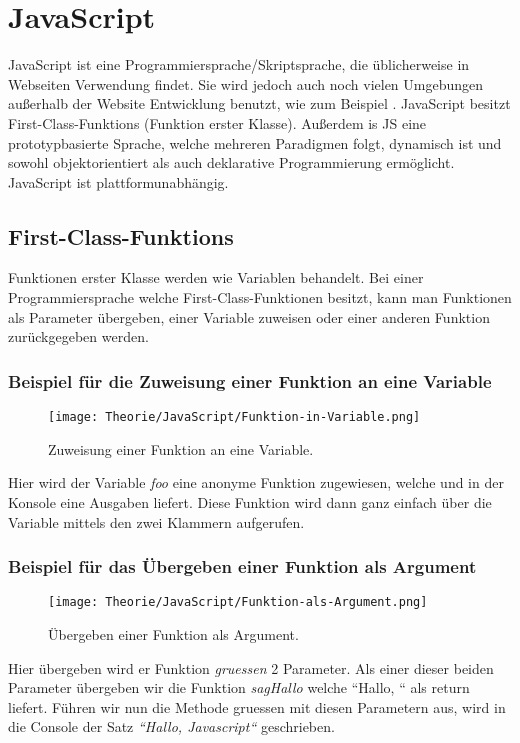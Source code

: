 \section{JavaScript}
\label{js}

JavaScript ist eine Programmiersprache/Skriptsprache, die üblicherweise in Webseiten Verwendung findet. Sie wird jedoch auch noch vielen Umgebungen außerhalb der Website Entwicklung benutzt, 
wie zum Beispiel .
JavaScript besitzt First-Class-Funktions (Funktion erster Klasse). Außerdem is JS eine prototypbasierte Sprache, welche mehreren Paradigmen folgt, dynamisch ist und sowohl 
objektorientiert als auch deklarative Programmierung ermöglicht. JavaScript ist plattformunabhängig.

\subsection{First-Class-Funktions}
Funktionen erster Klasse werden wie Variablen behandelt. Bei einer Programmiersprache welche First-Class-Funktionen besitzt, kann man Funktionen als Parameter übergeben, einer Variable zuweisen oder
einer anderen Funktion zurückgegeben werden.
\pagebreak

\begin{center}
    \subsubsection{Beispiel für die Zuweisung einer Funktion an eine Variable}
\begin{figure}[htbp]
    \centerline{\texttt{[image: Theorie/JavaScript/Funktion-in-Variable.png]}}
    \caption{Zuweisung einer Funktion an eine Variable.~\cite{First-Class-Funktion}}
\end{figure}
\end{center}
Hier wird der Variable \textit{foo} eine anonyme Funktion zugewiesen, welche und in der Konsole eine Ausgaben liefert.
Diese Funktion wird dann ganz einfach über die Variable mittels den zwei Klammern aufgerufen.


\begin{center}
    \subsubsection{Beispiel für das Übergeben einer Funktion als Argument}
\begin{figure}[htbp]
    \centerline{\texttt{[image: Theorie/JavaScript/Funktion-als-Argument.png]}}
    \caption{Übergeben einer Funktion als Argument.~\cite{First-Class-Funktion}}
\end{figure}
\end{center}
Hier übergeben wird er Funktion \textit{gruessen} 2 Parameter. Als einer dieser beiden Parameter übergeben wir die Funktion \textit{sagHallo} welche ``Hallo, `` als return liefert.
Führen wir nun die Methode gruessen mit diesen Parametern aus, wird in die Console der Satz \textit{``Hallo, Javascript``} geschrieben.
\pagebreak

